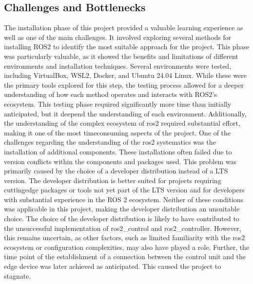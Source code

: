 \subsection{Challenges and Bottlenecks}

The installation phase of this project provided a valuable learning experience as well as one of the main challenges. It involved exploring several methods for installing ROS2 to identify the most suitable approach for the project. This phase was particularly valuable, as it showed the benefits and limitations of different environments and installation techniques.
Several environments were tested, including VirtualBox, WSL2, Docker, and Ubuntu 24.04 Linux. While these were the primary tools explored for this step, the testing process allowed for a deeper understanding of how each method operates and interacts with ROS2's ecosystem.
This testing phase required significantly more time than initially anticipated, but it deepend the understanding of each environment.
Additionally, the understanding of the complex ecosystem of ros2 required substantial effort, making it one of the most time\-consuming aspects of the project. One of the challenges regarding the understanding of the ros2 systematics was the installation of 
additional components. 
These installations often failed due to version conflicts within the components and packages used. This problem was primarily caused by the choice of a developer distribution instead of a LTS version. The developer distribution is better suited for projects requiring cutting\-edge packages or tools not yet part of the LTS version and for developers with substantial experience in the ROS 2 ecosystem. Neither of these conditions was applicable in this project, making the developer distribution an unsuitable choice. The choice of the developer distribution is likely to have contributed to the unsuccessful implementation of ros2\_control and ros2\_controller. However, this remains uncertain, as other factors, such as limited familiarity with the ros2 ecosystem or configuration complexities, may also have played a role. Further, the time point of the establishment of a connection between the control unit and the edge device was later achieved as anticipated. This caused the project to stagnate. 
